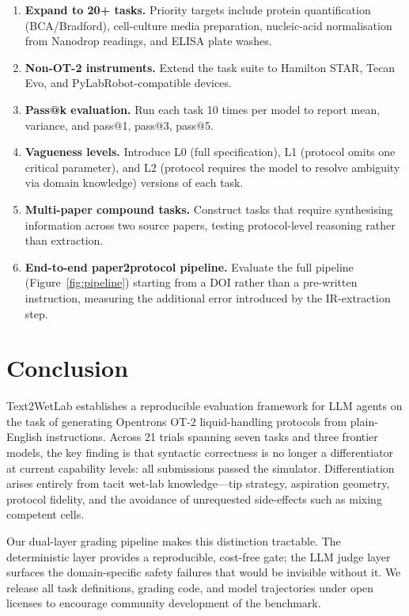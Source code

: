 \documentclass[11pt,a4paper]{article}
\begin{document}
\begin{enumerate}[leftmargin=*]
  \item \textbf{Expand to 20+ tasks.} Priority targets include protein
    quantification (BCA/Bradford), cell-culture media preparation,
    nucleic-acid normalisation from Nanodrop readings, and ELISA plate
    washes.
  \item \textbf{Non-OT-2 instruments.} Extend the task suite to
    Hamilton STAR, Tecan Evo, and PyLabRobot-compatible devices.
  \item \textbf{Pass@k evaluation.} Run each task 10 times per model to
    report mean, variance, and pass@1, pass@3, pass@5.
  \item \textbf{Vagueness levels.} Introduce L0 (full specification),
    L1 (protocol omits one critical parameter), and L2 (protocol requires
    the model to resolve ambiguity via domain knowledge) versions of each
    task.
  \item \textbf{Multi-paper compound tasks.} Construct tasks that require
    synthesising information across two source papers, testing
    protocol-level reasoning rather than extraction.
  \item \textbf{End-to-end paper2protocol pipeline.} Evaluate the full
    pipeline (Figure~\ref{fig:pipeline}) starting from a DOI rather than
    a pre-written instruction, measuring the additional error introduced by
    the IR-extraction step.
\end{enumerate}

\section{Conclusion}
\label{sec:conclusion}

Text2WetLab establishes a reproducible evaluation framework for LLM agents
on the task of generating Opentrons OT-2 liquid-handling protocols from
plain-English instructions.
Across 21 trials spanning seven tasks and three frontier models, the key
finding is that syntactic correctness is no longer a differentiator at
current capability levels: all submissions passed the simulator.
Differentiation arises entirely from tacit wet-lab knowledge---tip
strategy, aspiration geometry, protocol fidelity, and the avoidance of
unrequested side-effects such as mixing competent cells.

Our dual-layer grading pipeline makes this distinction tractable.
The deterministic layer provides a reproducible, cost-free gate; the LLM
judge layer surfaces the domain-specific safety failures that would be
invisible without it.
We release all task definitions, grading code, and model trajectories under
open licenses to encourage community development of the benchmark.
\end{document}
